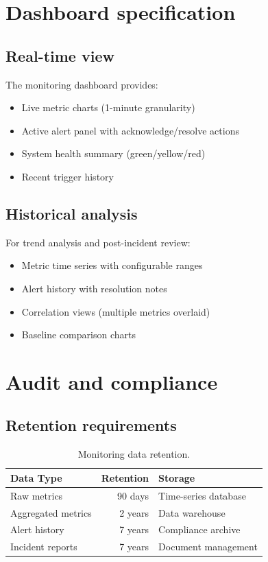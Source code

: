 \section{Dashboard specification}

\subsection{Real-time view}

The monitoring dashboard provides:

\begin{itemize}
  \item Live metric charts (1-minute granularity)
  \item Active alert panel with acknowledge/resolve actions
  \item System health summary (green/yellow/red)
  \item Recent trigger history
\end{itemize}

\subsection{Historical analysis}

For trend analysis and post-incident review:

\begin{itemize}
  \item Metric time series with configurable ranges
  \item Alert history with resolution notes
  \item Correlation views (multiple metrics overlaid)
  \item Baseline comparison charts
\end{itemize}

\section{Audit and compliance}

\subsection{Retention requirements}

\begin{table}[htbp]
\centering
\caption{Monitoring data retention.}
\label{tab:monitor-retention}
\footnotesize
\begin{tabularx}{\linewidth}{@{}l r X@{}}
\toprule
\textbf{Data Type} & \textbf{Retention} & \textbf{Storage} \\ \midrule
Raw metrics & 90 days & Time-series database \\
Aggregated metrics & 2 years & Data warehouse \\
Alert history & 7 years & Compliance archive \\
Incident reports & 7 years & Document management \\
\bottomrule
\end{tabularx}
\end{table}

